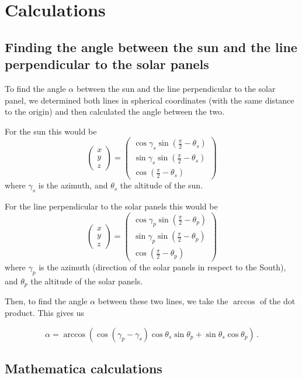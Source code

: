 \documentclass{article}
\newcommand{\vvec}[1]{\begin{pmatrix}
                          #1
\end{pmatrix}}
\begin{document}
    \section{Calculations}\label{sec:calculations}
    \subsection{Finding the angle between the sun and the line perpendicular to the solar panels}\label{subsec:findingTheAngleBetweenTheSunAndTheLinePerpendicularToTheSolarPanels}
    To find the angle $\alpha$ between the sun and the line perpendicular to the solar panel, we determined both lines in spherical coordinates (with the same distance to the origin) and then calculated the angle between the two.


    For the sun this would be
    \[
        \vvec{x \\ y \\ z} =
        \vvec{\cos \gamma_s \sin \left(\frac{\pi}{2} - \theta_s\right) \\
        \sin \gamma_s \sin \left(\frac{\pi}{2} - \theta_s\right) \\
        \cos \left(\frac{\pi}{2} - \theta_s\right)}
    \]
    where $ \gamma_s $ is the azimuth, and $ \theta_s $ the altitude of the sun.


    For the line perpendicular to the solar panels this would be
    \[
        \vvec{x \\ y \\ z} =
        \vvec{\cos \gamma_p \sin \left(\frac{\pi}{2} - \theta_p\right) \\
        \sin \gamma_p \sin \left(\frac{\pi}{2} - \theta_p\right) \\
        \cos \left(\frac{\pi}{2} - \theta_p\right)}
    \]
    where $ \gamma_p $ is the azimuth (direction of the solar panels in respect to the South), and $ \theta_p $ the altitude of the solar panels.

    Then, to find the angle $\alpha$ between these two lines, we take the $ \arccos $ of the dot product.
    This gives us

    \[
        \alpha = \arccos (\cos (\gamma_p - \gamma_s) \cos \theta_s \sin \theta_p + \sin \theta_s \cos \theta_p)\,.
    \]

    \subsection{Mathematica calculations}\label{subsec:mathematicaCalculations}
\end{document}
